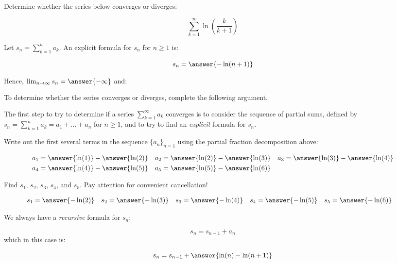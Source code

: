 \documentclass{ximera}
\author{Jim Talamo}
\begin{document}
\begin{exercise}
Determine whether the series below converges or diverges:

\[
\sum_{k=1}^{\infty} \ln \left(\frac{k}{k+1}\right)
\]

Let $s_n = \sum_{k=1}^n a_k$.  An explicit formula for $s_n$ for $n \geq 1$ is:

\[
s_n = \answer{-\ln(n+1)}
\]

\begin{exercise}
Hence, $\lim_{n \to \infty} s_n = \answer{-\infty}$ and:

\begin{multipleChoice}
\end{multipleChoice}

\begin{hint}
To determine whether the series converges or diverges, complete the following argument.

The first step to try to determine if a series $\sum_{k=1}^{\infty}a_k$ converges is to consider the sequence of partial sums, defined by $s_n = \sum_{k=1}^{n} a_k = a_1+\ldots + a_n$ for $n \geq 1$, and to try to find an \emph{explicit} formula for $s_n$.


Write out the first several terms in the sequence $\{a_n\}_{n=1}$ using the partial fraction decomposition above:

\begin{align*}
a_1 &= \answer{\ln(1)} - \answer{\ln(2)} & a_2 &= \answer{\ln(2)}-\answer{\ln(3)} & a_3 &= \answer{\ln(3)}-\answer{\ln(4)} \\
 a_4 &= \answer{\ln(4)}-\answer{\ln(5)}& a_5 &= \answer{\ln(5)}-\answer{\ln(6)}
\end{align*}

\begin{question}
Find $s_1$, $s_2$, $s_3$, $s_4$, and $s_5$.  Pay attention for convenient cancellation!

\begin{align*}
s_1 &= \answer{-\ln(2)} & s_2 &=  \answer{-\ln(3)} & s_3 &=  \answer{-\ln(4)} & s_4 &= \answer{-\ln(5)}& s_5 &= \answer{-\ln(6)} 
\end{align*}

\begin{question}
We always have a \emph{recursive} formula for $s_n$:

\[
s_n = s_{n-1} +a_n
\]
 which in this case is:
 
 \[
 s_n= s_{n-1} + \answer{\ln(n)-\ln(n+1)}
 \]
 

\end{question}
\end{question}
\end{hint}
\end{exercise}
\end{exercise}
\end{document}

